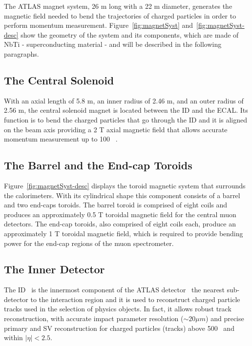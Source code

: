 			\noindent The \ac{ATLAS} magnet system, 26 m long with a 22 m diameter, generates the magnetic field needed to bend the trajectories of charged particles in order to perform momentum measurement. Figure~\ref{fig:magnetSyst} and~\ref{fig:magnetSyst-desc} show the geometry of the system and its components, which are made of NbTi - superconducting material - and will be described in the following paragraphs. 



			\subsection*{The Central Solenoid}

				With an axial length of 5.8 m, an inner radius of 2.46 m, and an outer radius of 2.56 m, the central solenoid magnet is located between the \ac{ID} and the \ac{ECAL}. Its function is to bend the charged particles that go through the \ac{ID} and it is aligned on the beam axis providing a 2 T axial magnetic field that allows accurate momentum measurement up to 100 \GeV~\cite{YAMAMOTO200853}.

			\subsection*{The Barrel and the End-cap Toroids}

				Figure~\ref{fig:magnetSyst-desc} displays the toroid magnetic system that surrounds the calorimeters. With its cylindrical shape this component consists of a barrel and two end-caps toroids. The barrel toroid is comprised of eight coils and produces an approximately 0.5 T toroidal magnetic field for the central muon detectors. The end-cap toroids, also comprised of eight coils each, produce an approximately 1 T toroidal magnetic field, which is required to provide bending power for the end-cap regions of the muon spectrometer.
				
		\subsection{The Inner Detector}
		\label{sec:ID}

			The \ac{ID}~\cite{ATLASInDet} is the innermost component of the \ac{ATLAS} detector \ie\ the nearest sub-detector to the interaction region and it is used to reconstruct charged particle tracks used in the selection of physics objects. In fact, it allows robust track reconstruction, with accurate impact parameter resolution ($\sim 20 \mu m$) and precise primary and \ac{SV} reconstruction for charged particles (tracks) above 500 \MeV\ and within $\displaystyle|\eta| < 2.5$.

